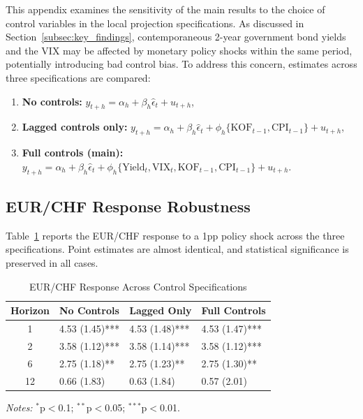 \documentclass[12pt,a4paper]{article}
\begin{document}
\begin{appendices}
This appendix examines the sensitivity of the main results to the choice of control variables in the local projection specifications. As discussed in Section~\ref{subsec:key_findings}, contemporaneous 2-year government bond yields and the VIX may be affected by monetary policy shocks within the same period, potentially introducing bad control bias. To address this concern, estimates across three specifications are compared:

\begin{enumerate}
	\item \textbf{No controls:} $y_{t+h} = \alpha_h + \beta_h \hat{\epsilon}_t + u_{t+h}$,
	\item \textbf{Lagged controls only:} $y_{t+h} = \alpha_h + \beta_h \hat{\epsilon}_t + \phi_h \{\text{KOF}_{t-1}, \text{CPI}_{t-1}\} + u_{t+h}$,
	\item \textbf{Full controls (main):} $y_{t+h} = \alpha_h + \beta_h \hat{\epsilon}_t + \phi_h \{\text{Yield}_{t}, \text{VIX}_{t}, \text{KOF}_{t-1}, \text{CPI}_{t-1}\} + u_{t+h}$.
\end{enumerate}

\subsection{EUR/CHF Response Robustness}

Table~\ref{tab:robust_controls_fx} reports the EUR/CHF response to a 1pp policy shock across the three specifications. Point estimates are almost identical, and statistical significance is preserved in all cases.

\begin{table}[H]
	\centering
	\caption{EUR/CHF Response Across Control Specifications} 
	\label{tab:robust_controls_fx}
	\begin{tabular}{clll}
		\toprule
		Horizon & No Controls & Lagged Only & Full Controls \\ 
		\midrule
		1  & 4.53 (1.45)*** & 4.53 (1.48)*** & 4.53 (1.47)*** \\ 
		2  & 3.58 (1.12)*** & 3.58 (1.14)*** & 3.58 (1.12)*** \\ 
		6  & 2.75 (1.18)**  & 2.75 (1.23)**  & 2.75 (1.30)**  \\ 
		12 & 0.66 (1.83)    & 0.63 (1.84)    & 0.57 (2.01)    \\ 
		\bottomrule
	\end{tabular}
	\vspace{0.2cm}
	
	{\footnotesize
		\textit{Notes:} $^{*}$p$<$0.1; $^{**}$p$<$0.05; $^{***}$p$<$0.01.}
\end{table}


\end{appendices}
\end{document}
